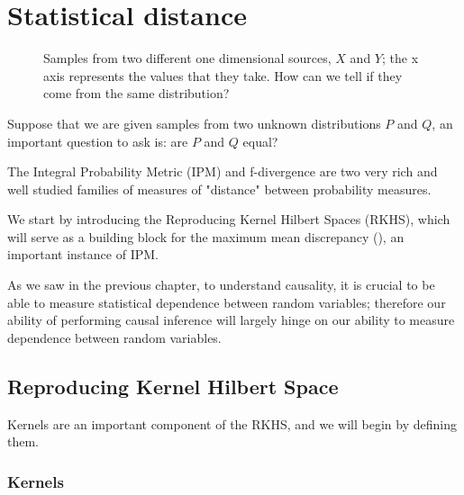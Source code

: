 \chapter{Statistical distance}





\begin{figure}[H]
    \captionsetup[subfigure]{labelformat=empty}
    \centering
    \qquad
    \caption{Samples from two different one dimensional sources, $X$ and $Y$; the x 
    axis represents the values that they take. 
    How can we tell if they come from the same distribution?}
    \label{fig:scatter_dist_questions}%
\end{figure}


Suppose that we are given samples from two unknown distributions $P$ and $Q$, an 
important question to ask is: are $P$ and $Q$ equal?


The Integral Probability Metric (IPM) and f-divergence are two very rich and well studied
families of measures of "distance" between probability measures.

We start by introducing the Reproducing Kernel Hilbert Spaces (RKHS), which will serve as a 
building block for the maximum mean discrepancy (\cite{TwoSampleTestGrettonBernhard}), an important instance of IPM.

As we saw in the previous chapter, to understand causality, it is crucial to be able to 
measure statistical dependence between random variables; therefore our ability of 
performing causal inference will largely hinge on our ability to measure dependence 
between random variables. 

\newpage
\section{Reproducing Kernel Hilbert Space}

Kernels are an important component of the RKHS, and we will begin by defining them.

\subsection{Kernels}

